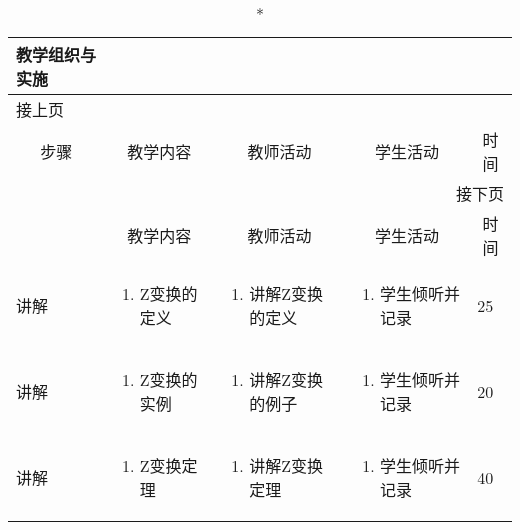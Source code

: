 {%
\begin{landscape}

\begin{longtable}{|m{10mm}|m{50mm}|m{50mm}|m{50mm}|m{15mm}|}
\caption*{\huge 教学组织与实施}\\
\hline
\endfirsthead
\multicolumn{5}{l}{\small 接上页}\\
\hline
\multicolumn{1}{|c|}{步骤}&\multicolumn{1}{c|}{教学内容}&\multicolumn{1}{c|}{教师活动}&\multicolumn{1}{c|}{学生活动}&\multicolumn{1}{c|}{时间}\\
\hline
\endhead

\multicolumn{5}{r}{\small 接下页}\\
\endfoot
\hline
\endlastfoot
\multicolumn{1}{|c|}{步骤}&\multicolumn{1}{c|}{教学内容}&\multicolumn{1}{c|}{教师活动}&\multicolumn{1}{c|}{学生活动}&\multicolumn{1}{c|}{时间}\\\hline
讲解&\begin{enumerate}
\item Z变换的定义
\end{enumerate} &\begin{enumerate}
\item 讲解Z变换的定义
\end{enumerate} &\begin{enumerate}
\item 学生倾听并记录
\end{enumerate} &25\\\hline
讲解&\begin{enumerate}
\item Z变换的实例
\end{enumerate}
 &\begin{enumerate}
\item 讲解Z变换的例子
\end{enumerate} &\begin{enumerate}
\item 学生倾听并记录
\end{enumerate} &20 \\\hline
讲解&\begin{enumerate}
\item Z变换定理
\end{enumerate}
&\begin{enumerate}
\item 讲解Z变换定理
\end{enumerate} &\begin{enumerate}
\item 学生倾听并记录
\end{enumerate} &40 \\\hline


\end{longtable}
\end{landscape}}
